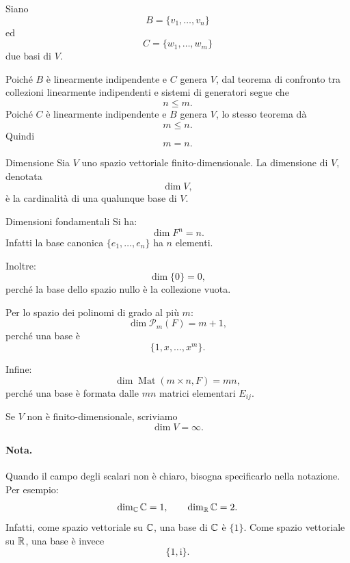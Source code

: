 \documentclass[a4paper]{article}
\begin{document}
\begin{snippetproof}{}
    Siano
    \[
        B=\{v_1,\ldots,v_n\}
    \]
    ed
    \[
        C=\{w_1,\ldots,w_m\}
    \]
    due basi di \(V\).

    Poiché \(B\) è linearmente indipendente e \(C\) genera \(V\), dal teorema di confronto tra collezioni linearmente indipendenti e sistemi di generatori segue che
    \[
        n\leq m.
    \]
    Poiché \(C\) è linearmente indipendente e \(B\) genera \(V\), lo stesso teorema dà
    \[
        m\leq n.
    \]
    Quindi
    \[
        m=n.
    \]
\end{snippetproof}

\begin{snippetdefinition}{Dimensione}
    Sia \(V\) uno spazio vettoriale finito-dimensionale. La dimensione di \(V\), denotata
    \[
        \dim V,
    \]
    è la cardinalità di una qualunque base di \(V\).
\end{snippetdefinition}

\begin{snippetexample}{Dimensioni fondamentali}
    Si ha:
    \[
        \dim F^n=n.
    \]
    Infatti la base canonica \(\{e_1,\ldots,e_n\}\) ha \(n\) elementi.

    Inoltre:
    \[
        \dim \{0\}=0,
    \]
    perché la base dello spazio nullo è la collezione vuota.

    Per lo spazio dei polinomi di grado al più \(m\):
    \[
        \dim \mathcal{P}_m(F)=m+1,
    \]
    perché una base è
    \[
        \{1,x,\ldots,x^m\}.
    \]

    Infine:
    \[
        \dim \operatorname{Mat}(m\times n,F)=mn,
    \]
    perché una base è formata dalle \(mn\) matrici elementari \(E_{ij}\).
\end{snippetexample}

Se \(V\) non è finito-dimensionale, scriviamo
\[
    \dim V=\infty.
\]

\paragraph{Nota.}
Quando il campo degli scalari non è chiaro, bisogna specificarlo nella notazione. Per esempio:
\[
    \dim_{\mathbb{C}}\mathbb{C}=1,
    \qquad
    \dim_{\mathbb{R}}\mathbb{C}=2.
\]
Infatti, come spazio vettoriale su \(\mathbb{C}\), una base di \(\mathbb{C}\) è \(\{1\}\). Come spazio vettoriale su \(\mathbb{R}\), una base è invece
\[
    \{1,\mathrm{i}\}.
\]
\end{document}

